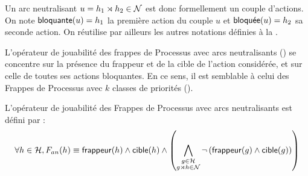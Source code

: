 Un arc neutralisant $u = h_1\rtimes h_2 \in \mathcal{N}$ est donc formellement un couple d'actions.
On note $\mathsf{bloquante}(u) = h_1$ la première action du couple $u$
et $\mathsf{bloqu\acute{e}e}(u) = h_2$ sa seconde action.
On réutilise par ailleurs les autres notations définies à la .

L'opérateur de jouabilité des frappes de Processus avec arcs neutralisants ()
se concentre sur la présence du frappeur et de la cible de l'action considérée,
et sur celle de toutes ses actions bloquantes.
En ce sens, il est semblable à celui des Frappes de Processus avec $k$ classes de priorités
().

\begin{definition}
  L'opérateur de jouabilité des Frappes de Processus avec arcs neutralisants est défini par :
  \[\forall h \in \mathcal{H}, F_{an}(h) \equiv \mathsf{frappeur}(h) \wedge \mathsf{cible}(h) \wedge
    \left( \bigwedge_{\substack{g \in \mathcal{H}\\g\rtimes h \in \mathcal{N}}}
    \neg \left( \mathsf{frappeur}(g) \wedge \mathsf{cible}(g) \right) \right)\]
\end{definition}



